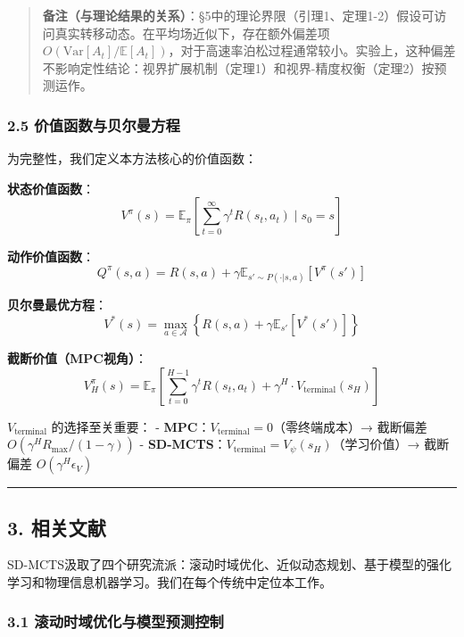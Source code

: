 \documentclass[UTF8]{ctexart}
\begin{document}
\begin{quote}
\textbf{备注（与理论结果的关系）}：§5中的理论界限（引理1、定理1-2）假设可访问真实转移动态。在平均场近似下，存在额外偏差项
\(O(\text{Var}[A_t]/\mathbb{E}[A_t])\)，对于高速率泊松过程通常较小。实验上，这种偏差不影响定性结论：视界扩展机制（定理1）和视界-精度权衡（定理2）按预测运作。
\end{quote}

\hypertarget{ux4ef7ux503cux51fdux6570ux4e0eux8d1dux5c14ux66fcux65b9ux7a0b}{%
\subsubsection{2.5
价值函数与贝尔曼方程}\label{ux4ef7ux503cux51fdux6570ux4e0eux8d1dux5c14ux66fcux65b9ux7a0b}}

为完整性，我们定义本方法核心的价值函数：

\textbf{状态价值函数}：
\[V^\pi(s) = \mathbb{E}_\pi\left[\sum_{t=0}^{\infty} \gamma^t R(s_t, a_t) \mid s_0 = s\right]\]

\textbf{动作价值函数}：
\[Q^\pi(s,a) = R(s,a) + \gamma \mathbb{E}_{s' \sim P(\cdot|s,a)}[V^\pi(s')]\]

\textbf{贝尔曼最优方程}：
\[V^*(s) = \max_{a \in \mathcal{A}} \left\{R(s,a) + \gamma \mathbb{E}_{s'}[V^*(s')]\right\}\]

\textbf{截断价值（MPC视角）}：
\[V_H^\pi(s) = \mathbb{E}_\pi\left[\sum_{t=0}^{H-1} \gamma^t R(s_t, a_t) + \gamma^H \cdot V_{\text{terminal}}(s_H)\right]\]

\(V_{\text{terminal}}\) 的选择至关重要： -
\textbf{MPC}：\(V_{\text{terminal}} = 0\)（零终端成本）→ 截断偏差
\(O(\gamma^H R_{\max}/(1-\gamma))\) -
\textbf{SD-MCTS}：\(V_{\text{terminal}} = V_\psi(s_H)\)（学习价值）→
截断偏差 \(O(\gamma^H \epsilon_V)\)

\begin{center}\rule{0.5\linewidth}{0.4pt}\end{center}

\hypertarget{ux76f8ux5173ux6587ux732e}{%
\subsection{3. 相关文献}\label{ux76f8ux5173ux6587ux732e}}

SD-MCTS汲取了四个研究流派：滚动时域优化、近似动态规划、基于模型的强化学习和物理信息机器学习。我们在每个传统中定位本工作。

\hypertarget{ux6edaux52a8ux65f6ux57dfux4f18ux5316ux4e0eux6a21ux578bux9884ux6d4bux63a7ux5236}{%
\subsubsection{3.1
滚动时域优化与模型预测控制}\label{ux6edaux52a8ux65f6ux57dfux4f18ux5316ux4e0eux6a21ux578bux9884ux6d4bux63a7ux5236}}
\end{document}
